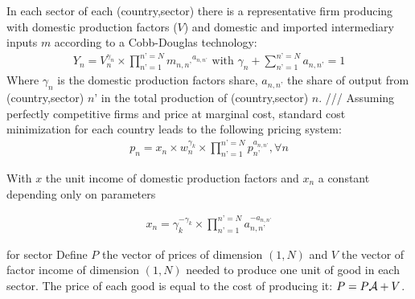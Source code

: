 \documentclass[11pt,a4paper]{article}
\begin{document}
In each sector of each (country,sector) there is a representative firm producing with domestic production factors ($V$) and domestic and imported intermediary inputs $m$ according to a Cobb-Douglas technology:
\begin{eqnarray*}
Y_n=V^{\gamma_n}_n \times \prod_{n’=1}^{n’=N} {m_{n,n’}}^{a_{n,n’}} \text{ with } \gamma_n +\sum_{n’=1}^{n’=N} {a_{n,n’}} =1
\end{eqnarray*}
Where $\gamma_n$ is the domestic production factors share, $a_{n,n’}$ the share of output from (country,sector) $n’$ in the total production of (country,sector) $n$. ///
Assuming perfectly competitive firms and price at marginal cost, standard cost minimization for each country leads to the following pricing system:
\begin{eqnarray*}
	p_n=x_n \times w_n^{\gamma_k} \times \prod_{n’=1}^{n’=N}p_{n’}^{a_{n,n’}}, \forall n 
\end{eqnarray*}

With $x$ the unit income of domestic production factors and $x_n$ a constant depending only on parameters

\begin{eqnarray*}
	x_n=\gamma_k^{-\gamma_k} \times \prod_{n’=1}^{n’=N}a_{n,n’}^{-a_{n,n’}}
\end{eqnarray*}



 for sector 
Define $P$ the vector of prices of dimension $(1, N)$ and $V$ the vector of factor income of dimension $(1, N)$ needed to produce one unit of good in each sector. The price of each good is equal to the cost of producing it: $P=P{\cal A}+V$. \\
\end{document}
